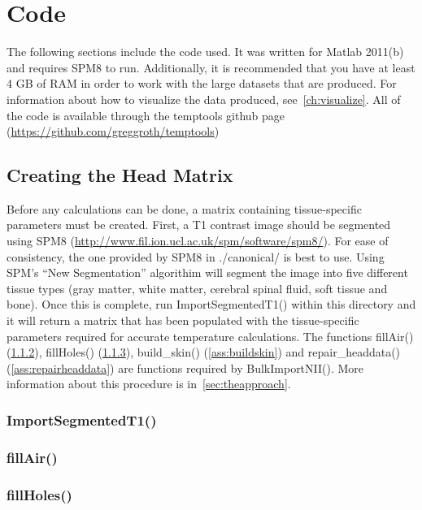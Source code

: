 \appendix
\addappheadtotoc
\chapter{Code}
\label{appendix:code}
The following sections include the code used.  It was written for Matlab 2011(b) and requires SPM8 to run.  Additionally, it is recommended that you have at least 4 GB of RAM in order to work with the large datasets that are produced.  For information about how to visualize the data produced, see~\cref{ch:visualize}.  All of the code is available through the temptools github page (\url{https://github.com/greggroth/temptools})
\section{Creating the Head Matrix}
\label{sec:headmatrix}
Before any calculations can be done, a matrix containing tissue-specific parameters must be created.  First, a T1 contrast image should be segmented using SPM8 (\url{http://www.fil.ion.ucl.ac.uk/spm/software/spm8/}).  For ease of consistency, the one provided by SPM8 in ./canonical/ is best to use.  Using SPM's ``New Segmentation'' algorithim will segment the image into five different tissue types (gray matter, white matter, cerebral spinal fluid, soft tissue and bone).  Once this is complete, run ImportSegmentedT1() within this directory and it will return a matrix that has been populated with the tissue-specific parameters required for accurate temperature calculations. The functions fillAir() (\ref{ass:fillair}), fillHoles() (\ref{ass:fillHoles}), build\_skin() (\ref{ass:buildskin}) and repair\_headdata() (\ref{ass:repairheaddata}) are functions required by BulkImportNII().  More information about this procedure is in~\cref{sec:theapproach}.
\subsection{ImportSegmentedT1()}

\subsection{fillAir()}
\label{ass:fillair}

\subsection{fillHoles()}
\label{ass:fillHoles}

